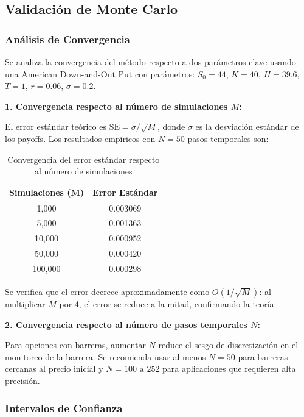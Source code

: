 \subsection{Validación de Monte Carlo}

\subsubsection{Análisis de Convergencia}

Se analiza la convergencia del método respecto a dos parámetros clave usando una American Down-and-Out Put con parámetros: $S_0 = 44$, $K = 40$, $H = 39.6$, $T = 1$, $r = 0.06$, $\sigma = 0.2$.

\textbf{1. Convergencia respecto al número de simulaciones $M$:}

El error estándar teórico es $\text{SE} = \sigma/\sqrt{M}$, donde $\sigma$ es la desviación estándar de los payoffs. Los resultados empíricos con $N=50$ pasos temporales son:

\begin{table}[H]
\centering
\caption{Convergencia del error estándar respecto al número de simulaciones}
\begin{tabular}{cc}
\toprule
\textbf{Simulaciones (M)} & \textbf{Error Estándar} \\
\midrule
1,000 & 0.003069 \\
5,000 & 0.001363 \\
10,000 & 0.000952 \\
50,000 & 0.000420 \\
100,000 & 0.000298 \\
\bottomrule
\end{tabular}
\end{table}

Se verifica que el error decrece aproximadamente como $O(1/\sqrt{M})$: al multiplicar $M$ por 4, el error se reduce a la mitad, confirmando la teoría.

\textbf{2. Convergencia respecto al número de pasos temporales $N$:}

Para opciones con barreras, aumentar $N$ reduce el sesgo de discretización en el monitoreo de la barrera. Se recomienda usar al menos $N=50$ para barreras cercanas al precio inicial y $N=100 \text{ a } 252$ para aplicaciones que requieren alta precisión.

\subsubsection{Intervalos de Confianza}

